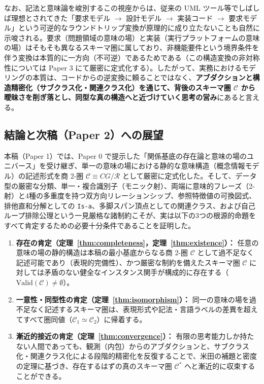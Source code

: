 \documentclass[11pt,a4paper]{ltjsarticle}
\theoremstyle{definition}
\theoremstyle{plain}
\theoremstyle{remark}
\newcommand{\Valid}{\mathrm{Valid}}
\begin{document}
なお、記法と意味論を峻別するこの視座からは、従来の UML ツール等でしばしば理想とされてきた「要求モデル $\to$ 設計モデル $\to$ 実装コード $\to$ 要求モデル」という可逆的なラウンドトリップ変換が原理的に成り立たないことも自然に示唆される。要求（問題領域の意味の場）と実装（実行プラットフォームの意味の場）はそもそも異なるスキーマ圏に属しており、非機能要件という境界条件を伴う変換は本質的に一方向（不可逆）であるためである（この構造変換の非対称性については Paper 3 にて厳密に定式化する）。したがって、実務におけるモデリングの本質は、コードからの逆変換に頼ることではなく、\textbf{アブダクションと構造精密化（サブクラス化・関連クラス化）を通じて、背後のスキーマ圏 $\mathcal{C}$ から曖昧さを削ぎ落とし、同型な真の構造へと近づけていく思考の営み}にあると言える。

\subsection{結論と次稿（Paper 2）への展望}
本稿（Paper 1）では、Paper 0 \cite{ota2026paper0} で提示した「関係基底の存在論と意味の場のユニバース」を受け継ぎ、単一の意味の場における静的な意味構造（概念情報モデル）の記述形式を商 2-圏 $\mathcal{C} \equiv CG/\mathcal{R}$ として厳密に定式化した。そして、データ型の厳密な分類、単一・複合識別子（モニック射）、両端に意味的フレーズ（2-射）と4種の多重度を持つ双方向リレーションシップ、参照特徴値の可換図式、排他直和分解としての \texttt{Is-a}、多脚スパン頂点としての関連クラス、および自己ループ排除公理という一見厳格な諸制約こそが、実は以下の3つの根源的命題をすべて肯定するための必要十分条件であることを証明した。
\begin{enumerate}
    \item \textbf{存在の肯定（定理~\ref{thm:completeness}，定理~\ref{thm:existence}）：} 任意の意味の場の静的構造は本稿の最小基底からなる商 2-圏 $\mathcal{C}$ として過不足なく記述可能であり（表現的完備性）、かつ厳密な制約を備えたスキーマ圏 $\mathcal{C}$ に対しては矛盾のない健全なインスタンス関手が構成的に存在する（$\Valid(\mathcal{C}) \neq \emptyset$）。
    \item \textbf{一意性・同型性の肯定（定理~\ref{thm:isomorphism}）：} 同一の意味の場を過不足なく記述するスキーマ圏は、表現形式や記法・言語ラベルの差異を超えてすべて圏同値（$\mathcal{C}_1 \simeq \mathcal{C}_2$）に帰着する。
    \item \textbf{漸近的接近の肯定（定理~\ref{thm:convergence}）：} 有限の思考能力しか持たない人間であっても、観測（内包）からのアブダクションと、サブクラス化・関連クラス化による段階的精密化を反復することで、米田の補題と密度の定理に基づき、存在するはずの真のスキーマ圏 $\mathcal{C}^*$ へと漸近的に収束することができる。
\end{enumerate}
\end{document}
